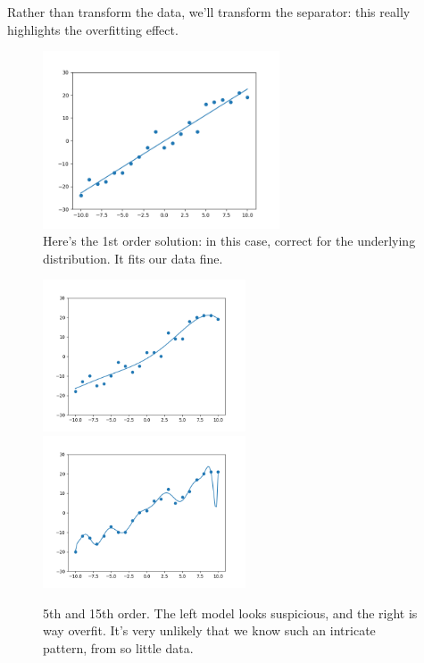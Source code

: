                Rather than transform the data, we'll transform the separator: this really highlights the overfitting effect.

                \begin{figure}[H]
                    \centering
                    
                    \includegraphics[width=70mm,scale=0.5]{images/feature_images/order_1_soln.png}
                    \caption*{Here's the 1st order solution: in this case, correct for the underlying distribution. It fits our data fine.}
                \end{figure}

                \begin{figure}[H]
                    \centering
                    
                    \includegraphics[width=60mm,scale=0.5]{images/feature_images/order_5_soln.png}
                    \includegraphics[width=60mm,scale=0.5]{images/feature_images/order_15_soln.png}
                    \caption*{5th and 15th order. The left model looks suspicious, and the right is way overfit. It's very unlikely that we know such an intricate pattern, from so little data.}
                \end{figure}

